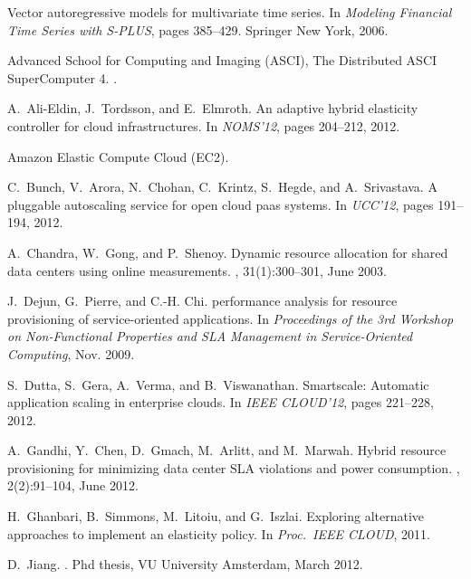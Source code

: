 \documentclass{sig-alternate-10pt}
\begin{document}
\begin{thebibliography}{10}

Vector autoregressive models for multivariate time series.
\newblock In {\em Modeling Financial Time Series with S-PLUS}, pages 385--429.
  Springer New York, 2006.

{ Advanced School for Computing and Imaging (ASCI), The Distributed ASCI
  SuperComputer 4. }.

A.~Ali-Eldin, J.~Tordsson, and E.~Elmroth.
\newblock An adaptive hybrid elasticity controller for cloud infrastructures.
\newblock In {\em NOMS'12}, pages 204--212, 2012.

{Amazon Elastic Compute Cloud (EC2)}.

C.~Bunch, V.~Arora, N.~Chohan, C.~Krintz, S.~Hegde, and A.~Srivastava.
\newblock A pluggable autoscaling service for open cloud paas systems.
\newblock In {\em UCC'12}, pages 191--194, 2012.

A.~Chandra, W.~Gong, and P.~Shenoy.
\newblock Dynamic resource allocation for shared data centers using online
  measurements.
, 31(1):300--301, June 2003.

J.~Dejun, G.~Pierre, and C.-H. Chi.
 performance analysis for resource provisioning of
  service-oriented applications.
\newblock In {\em Proceedings of the 3rd Workshop on Non-Functional Properties
  and SLA Management in Service-Oriented Computing}, Nov. 2009.

S.~Dutta, S.~Gera, A.~Verma, and B.~Viswanathan.
\newblock Smartscale: Automatic application scaling in enterprise clouds.
\newblock In {\em IEEE CLOUD'12}, pages 221--228, 2012.

A.~Gandhi, Y.~Chen, D.~Gmach, M.~Arlitt, and M.~Marwah.
\newblock Hybrid resource provisioning for minimizing data center {SLA}
  violations and power consumption.
, 2(2):91--104,
  June 2012.

H.~Ghanbari, B.~Simmons, M.~Litoiu, and G.~Iszlai.
\newblock Exploring alternative approaches to implement an elasticity policy.
\newblock In {\em Proc.\ IEEE CLOUD}, 2011.

D.~Jiang.
.
\newblock Phd thesis, VU University Amsterdam, March 2012.


\end{thebibliography}
\end{document}
